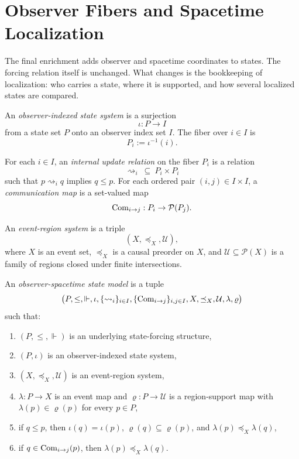 \section{Observer Fibers and Spacetime Localization}\label{sec:observer-spacetime}

The final enrichment adds observer and spacetime coordinates to states. The forcing relation itself is unchanged. What changes is the bookkeeping of localization: who carries a state, where it is supported, and how several localized states are compared.

\begin{definition}\label{def:observer-indexed-state-system}
An \emph{observer-indexed state system} is a surjection
\[
\iota:P\to I
\]
from a state set $P$ onto an observer index set $I$. The fiber over $i\in I$ is
\[
P_i:=\iota^{-1}(i).
\]
\end{definition}

\begin{definition}\label{def:internal-updates-and-communication}
For each $i\in I$, an \emph{internal update relation} on the fiber $P_i$ is a relation
\[
\rightsquigarrow_i\ \subseteq\ P_i\times P_i
\]
such that $p\rightsquigarrow_i q$ implies $q\le p$. For each ordered pair $(i,j)\in I\times I$, a \emph{communication map} is a set-valued map
\[
\mathrm{Com}_{i\to j}:P_i\to\mathcal{P}(P_j).
\]
\end{definition}

\begin{definition}\label{def:event-region-system}
An \emph{event-region system} is a triple
\[
(X,\preceq_X,\mathcal{U}),
\]
where $X$ is an event set, $\preceq_X$ is a causal preorder on $X$, and $\mathcal{U}\subseteq\mathcal{P}(X)$ is a family of regions closed under finite intersections.
\end{definition}

\begin{definition}\label{def:observer-spacetime-model}
An \emph{observer-spacetime state model} is a tuple
\[
\bigl(P,\le,\Vdash,\iota,\{\rightsquigarrow_i\}_{i\in I},\{\mathrm{Com}_{i\to j}\}_{i,j\in I},X,\preceq_X,\mathcal{U},\lambda,\varrho\bigr)
\]
such that:
\begin{enumerate}[label=(\roman*),nosep]
\item $(P,\le,\Vdash)$ is an underlying state-forcing structure,
\item $(P,\iota)$ is an observer-indexed state system,
\item $(X,\preceq_X,\mathcal{U})$ is an event-region system,
\item $\lambda:P\to X$ is an event map and $\varrho:P\to\mathcal{U}$ is a region-support map with $\lambda(p)\in\varrho(p)$ for every $p\in P$,
\item if $q\le p$, then $\iota(q)=\iota(p)$, $\varrho(q)\subseteq\varrho(p)$, and $\lambda(p)\preceq_X\lambda(q)$,
\item if $q\in \mathrm{Com}_{i\to j}(p)$, then $\lambda(p)\preceq_X\lambda(q)$.
\end{enumerate}
\end{definition}

